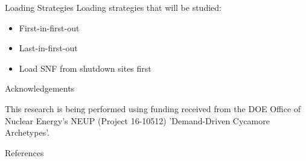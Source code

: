 \documentclass[final]{beamer}
\newlength{\onecolwid}
\newlength{\threecolwid}
\begin{document}
\begin{frame}[t]
\begin{columns}[t,totalwidth=\threecolwid]
\begin{column}{\onecolwid}
\begin{block}{Loading Strategies}
Loading strategies that will be studied: 
\begin{itemize}
	\item First-in-first-out
	\item Last-in-first-out
	\item Load \gls{SNF} from shutdown sites first \cite{petersen_determining_2017}
\end{itemize}
\end{block}




\begin{block}{Acknowledgements}
	
	This research is being performed using funding received from the DOE Office
	of Nuclear Energy's NEUP
	(Project 16-10512) 'Demand-Driven Cycamore Archetypes'.
	
	
\end{block}





\begin{block}{References}

	{\footnotesize 
	}
\end{block}





\end{column} %

\end{columns} %

\end{frame} %
\end{document}
